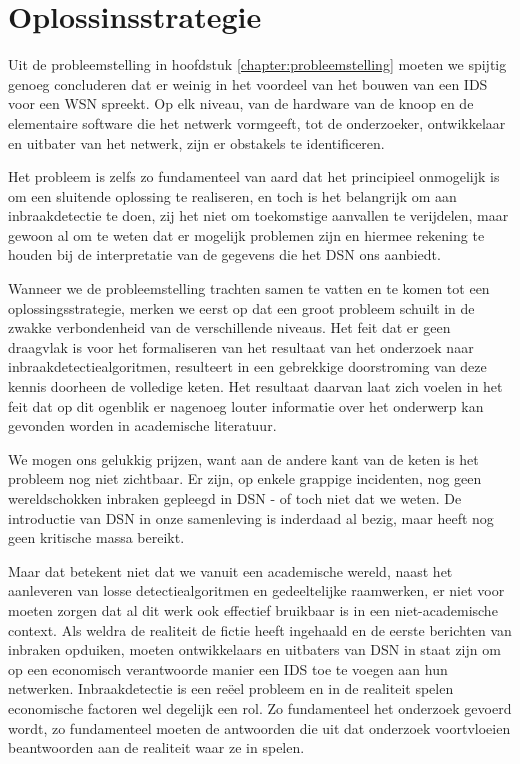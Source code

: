 
\chapter{Oplossinsstrategie}
\label{chapter:oplossingsstrategie}

Uit de probleemstelling in hoofdstuk \ref{chapter:probleemstelling} moeten we
spijtig genoeg concluderen dat er weinig in het voordeel van het bouwen van een
IDS voor een WSN spreekt. Op elk niveau, van de hardware van de knoop en de
elementaire software die het netwerk vormgeeft, tot de onderzoeker,
ontwikkelaar en uitbater van het netwerk, zijn er obstakels te identificeren.

Het probleem is zelfs zo fundamenteel van aard dat het principieel onmogelijk
is om een sluitende oplossing te realiseren, en toch is het belangrijk om aan
inbraakdetectie te doen, zij het niet om toekomstige aanvallen te verijdelen,
maar gewoon al om te weten dat er mogelijk problemen zijn en hiermee rekening
te houden bij de interpretatie van de gegevens die het DSN ons aanbiedt.

Wanneer we de probleemstelling trachten samen te vatten en te komen tot een
oplossingsstrategie, merken we eerst op dat een groot probleem schuilt in de
zwakke verbondenheid van de verschillende niveaus. Het feit dat er geen
draagvlak is voor het formaliseren van het resultaat van het onderzoek naar
inbraakdetectiealgoritmen, resulteert in een gebrekkige doorstroming van deze
kennis doorheen de volledige keten. Het resultaat daarvan laat zich voelen in
het feit dat op dit ogenblik er nagenoeg louter informatie over het onderwerp
kan gevonden worden in academische literatuur.

We mogen ons gelukkig prijzen, want aan de andere kant van de keten is het
probleem nog niet zichtbaar. Er zijn, op enkele grappige incidenten, nog geen
wereldschokken inbraken gepleegd in DSN - of toch niet dat we weten. De
introductie van DSN in onze samenleving is inderdaad al bezig, maar heeft nog
geen kritische massa bereikt.

Maar dat betekent niet dat we vanuit een academische wereld, naast het
aanleveren van losse detectiealgoritmen en gedeeltelijke raamwerken, er niet
voor moeten zorgen dat al dit werk ook effectief bruikbaar is in een
niet-academische context. Als weldra de realiteit de fictie heeft ingehaald en
de eerste berichten van inbraken opduiken, moeten ontwikkelaars en uitbaters
van DSN in staat zijn om op een economisch verantwoorde manier een IDS toe te
voegen aan hun netwerken. Inbraakdetectie is een re\"eel probleem en in de
realiteit spelen economische factoren wel degelijk een rol. Zo fundamenteel het
onderzoek gevoerd wordt, zo fundamenteel moeten de antwoorden die uit dat
onderzoek voortvloeien beantwoorden aan de realiteit waar ze in spelen.

